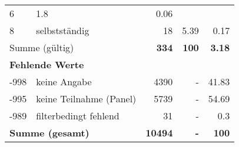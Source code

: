 \begin{longtable}{lXrrr}
       \num{6} &
       \num[round-mode=places,round-precision=2]{1.8} &
         \num[round-mode=places,round-precision=2]{0.06} \\

     8 &
     \multicolumn{1}{X}{ selbstständig   } &


       \num{18} &
       \num[round-mode=places,round-precision=2]{5.39} &
         \num[round-mode=places,round-precision=2]{0.17} \\
     \midrule
     \multicolumn{2}{l}{Summe (gültig)} &
       \textbf{\num{334}} &
     \textbf{\num{100}} &
       \textbf{\num[round-mode=places,round-precision=2]{3.18}} \\
     \multicolumn{5}{l}{\textbf{Fehlende Werte}}\\
       -998 &
       keine Angabe &
         \num{4390} &
        - &
         \num[round-mode=places,round-precision=2]{41.83} \\
       -995 &
       keine Teilnahme (Panel) &
         \num{5739} &
        - &
         \num[round-mode=places,round-precision=2]{54.69} \\
       -989 &
       filterbedingt fehlend &
         \num{31} &
        - &
         \num[round-mode=places,round-precision=2]{0.3} \\
     \midrule
     \multicolumn{2}{l}{\textbf{Summe (gesamt)}} &
          \textbf{\num{10494}} &
        \textbf{-} &
        \textbf{\num{100}} \\
     \bottomrule
     \end{longtable}
     
